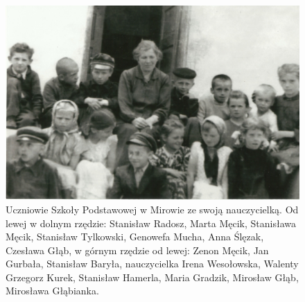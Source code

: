 \begin{figure}
\begin{center}
\includegraphics[width=\textwidth]{zdjecia/szkola_w_mirowie.jpg}
\caption[Uczniowie Szkoły Podstawowej w Mirowie]{Uczniowie Szkoły Podstawowej w Mirowie ze swoją nauczycielką. Od lewej w dolnym rzędzie: Stanisław Radosz, Marta Męcik, Stanisława Męcik, Stanisław Tylkowski, Genowefa Mucha, Anna Ślęzak, Czesława Głąb, w górnym rzędzie od lewej: Zenon Męcik, Jan Gurbała, Stanisław Baryła, nauczycielka Irena Wesołowska, Walenty Grzegorz Kurek, Stanisław Hamerla, Maria Gradzik, Mirosław Głąb, Mirosława Głąbianka.}
\label{rys:szkola_w_mirowie}
\end{center}
\end{figure}

